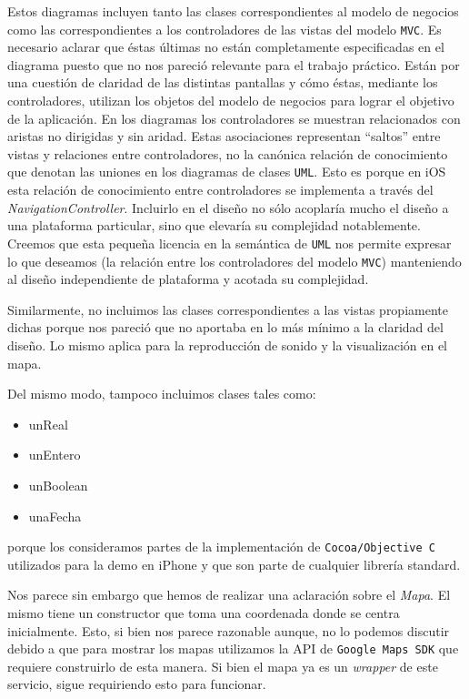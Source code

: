 \documentclass[10pt, a4paper,english,spanish]{article}
\renewcommand{\emph}[1]{\textit{#1}}
\begin{document}
Estos diagramas incluyen tanto las clases correspondientes al modelo de negocios como las correspondientes a los controladores de las vistas del modelo \texttt{MVC}. Es necesario aclarar que éstas últimas no están completamente especificadas en el diagrama puesto que no nos pareció relevante para el trabajo práctico. Están por una cuestión de claridad de las distintas pantallas y cómo éstas, mediante los controladores, utilizan los objetos del modelo de negocios para lograr el objetivo de la aplicación. En los diagramas los controladores se muestran relacionados con aristas no dirigidas y sin aridad. Estas asociaciones representan ``saltos'' entre vistas y relaciones entre controladores, no la canónica relación de conocimiento que denotan las uniones en los diagramas de clases \texttt{UML}. Esto es porque en iOS esta relación de conocimiento entre controladores se implementa a través del \emph{NavigationController}. Incluirlo en el diseño no sólo acoplaría mucho el diseño a una plataforma particular, sino que elevaría su complejidad notablemente. Creemos que esta pequeña licencia en la semántica de \texttt{UML} nos permite expresar lo que deseamos (la relación entre los controladores del modelo \texttt{MVC}) manteniendo al diseño independiente de plataforma y acotada su complejidad.

Similarmente, no incluimos las clases correspondientes a las vistas propiamente dichas porque nos pareció que no aportaba en lo más mínimo a la claridad del diseño. Lo mismo aplica para la reproducción de sonido y la visualización en el mapa. 

Del mismo modo, tampoco incluimos clases tales como:
\begin{itemize}
	\item unReal
	\item unEntero
	\item unBoolean
	\item unaFecha
\end{itemize}
porque los consideramos partes de la implementación de \texttt{Cocoa/Objective C} utilizados para la demo en iPhone y que son parte de cualquier librería standard.

Nos parece sin embargo que hemos de realizar una aclaración sobre el \textit{Mapa}. El mismo tiene un constructor que toma una coordenada donde se centra inicialmente. Esto, si bien nos parece razonable aunque, no lo podemos discutir debido a que para mostrar los mapas utilizamos la API de \texttt{Google Maps SDK} que requiere construirlo de esta manera. Si bien el mapa ya es un \textit{wrapper} de este servicio, sigue requiriendo esto para funcionar.
\end{document}
